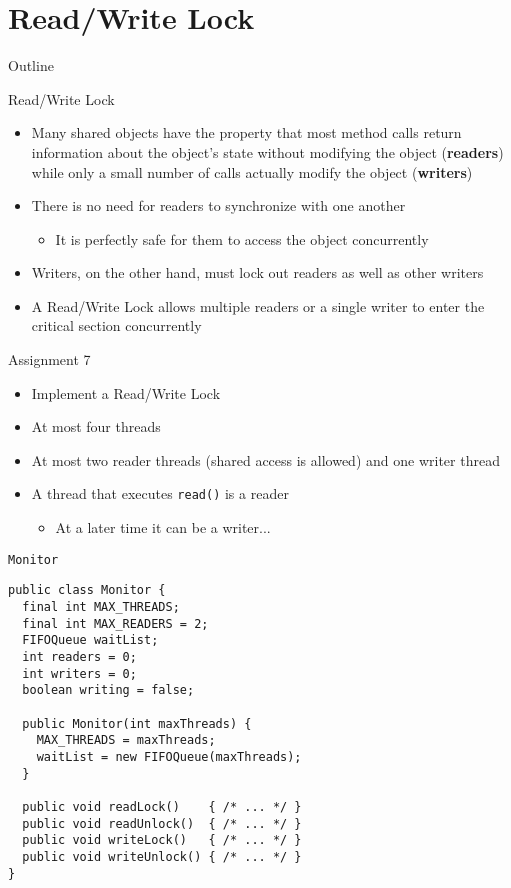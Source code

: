 \section{Read/Write Lock}

\begin{frame}{Outline}
  \tableofcontents[current]
\end{frame}

\begin{frame}{Read/Write Lock}
  \begin{itemize}
  \item Many shared objects have the property that most method calls
    return information about the object's state without modifying the
    object ({\bf readers}) while only a small number of calls actually
    modify the object ({\bf writers})
  \item There is no need for readers to synchronize with one another
    \begin{itemize}
    \item It is perfectly safe for them to access the object
      concurrently
    \end{itemize}
  \item Writers, on the other hand, must lock out readers as well as
    other writers
  \item A Read/Write Lock allows multiple readers or a single
    writer to enter the critical section concurrently
  \end{itemize}
\end{frame}

\begin{frame}{Assignment 7}
  \begin{itemize}
  \item Implement a Read/Write Lock
  \item At most four threads
  \item At most two reader threads (shared access is allowed) and one
    writer thread
  \item A thread that executes \lstinline!read()! is a reader
    \begin{itemize}
    \item At a later time it can be a writer...
    \end{itemize}
  \end{itemize}
\end{frame}

\begin{frame}[fragile]{\lstinline!Monitor!}
\begin{lstlisting}[basicstyle=\fontsize{10}{12}\selectfont\ttfamily]
public class Monitor {
  final int MAX_THREADS;
  final int MAX_READERS = 2;
  FIFOQueue waitList;
  int readers = 0;
  int writers = 0;
  boolean writing = false;
  
  public Monitor(int maxThreads) {
    MAX_THREADS = maxThreads;
    waitList = new FIFOQueue(maxThreads);
  }  
  
  public void readLock()    { /* ... */ }
  public void readUnlock()  { /* ... */ }
  public void writeLock()   { /* ... */ }
  public void writeUnlock() { /* ... */ }
}
\end{lstlisting}
\end{frame}

